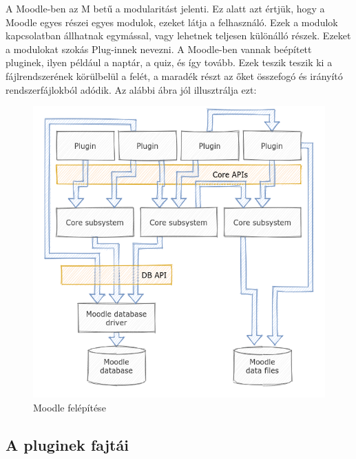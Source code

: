 A Moodle-ben az M betű a modularitást jelenti. Ez alatt azt értjük, hogy a Moodle egyes részei egyes modulok, ezeket látja a felhasználó. Ezek a modulok kapcsolatban állhatnak egymással, vagy lehetnek teljesen különálló részek. Ezeket a modulokat szokás Plug-innek nevezni. A Moodle-ben vannak beépített pluginek, ilyen például a naptár, a quiz, és így tovább. Ezek teszik teszik ki a fájlrendszerének körülbelül a felét, a maradék részt az őket összefogó és irányító rendszerfájlokból adódik. Az alábbi ábra jól illusztrálja ezt:

\begin{figure}
    \centering
    \includegraphics[scale=0.7]{Fejezetek/Images/moodleBuild.png} 
    \caption{\label{Moodle}Moodle felépítése \cite{MoodleTutorial}}
\end{figure}

\subsection{A pluginek fajtái}

